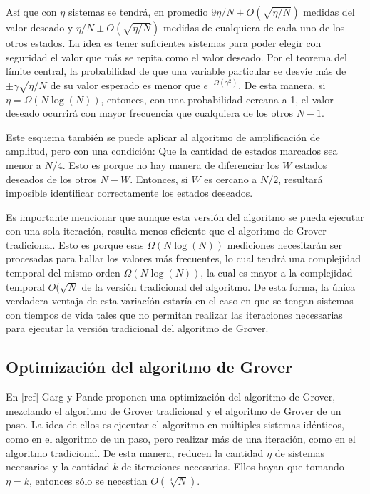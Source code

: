 Así que con $\eta$ sistemas se tendrá, en promedio $9 \eta/N \pm O(\sqrt{\eta/N})$ medidas del valor deseado y $\eta/N \pm O(\sqrt{\eta/N})$ medidas de cualquiera de cada uno de los otros estados. La idea es tener suficientes sistemas para poder elegir con seguridad el valor que más se repita como el valor deseado. Por el teorema del límite central, la probabilidad de que una variable particular se desvíe más de $\pm \gamma \sqrt{\eta/N}$ de su valor esperado es menor que $e^{- \Omega(\gamma^2)}$. De esta manera, si $\eta = \Omega(N \log(N))$, entonces, con una probabilidad cercana a 1, el valor deseado ocurrirá con mayor frecuencia que cualquiera de los otros $N-1$.

Este esquema también se puede aplicar al algoritmo de amplificación de amplitud, pero con una condición: Que la cantidad de estados marcados sea menor a $N/4$. Esto es porque no hay manera de diferenciar los $W$ estados deseados de los otros $N - W$. Entonces, si $W$ es cercano a $N/2$, resultará imposible identificar correctamente los estados deseados.

Es importante mencionar que aunque esta versión del algoritmo se pueda ejecutar con una sola iteración, resulta menos eficiente que el algoritmo de Grover tradicional. Esto es porque esas $\Omega(N \log(N))$ mediciones necesitarán ser procesadas para hallar los valores más frecuentes, lo cual tendrá una complejidad temporal del mismo orden $\Omega(N \log(N))$, la cual es mayor a la complejidad temporal $O(\sqrt{N}$ de la versión tradicional del algoritmo. De esta forma, la única verdadera ventaja de esta variacíón estaría en el caso en que se tengan sistemas con tiempos de vida tales que no permitan realizar las iteraciones necessarias para ejecutar la versión tradicional del algoritmo de Grover.

\subsection{Optimización del algoritmo de Grover}

En [ref] Garg y Pande proponen una optimización del algoritmo de Grover, mezclando el algoritmo de Grover tradicional y el algoritmo de Grover de un paso. La idea de ellos es ejecutar el algoritmo en múltiples sistemas idénticos, como en el algoritmo de un paso, pero realizar más de una iteración, como en el algoritmo tradicional. De esta manera, reducen la cantidad $\eta$ de sistemas necesarios y la cantidad $k$ de iteraciones necesarias. Ellos hayan que tomando $\eta = k$, entonces sólo se necestian $O(\sqrt[3]{N})$.

